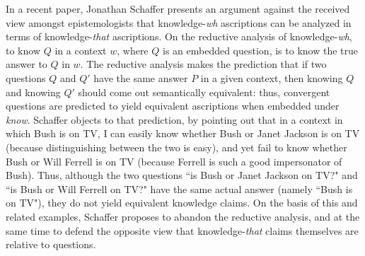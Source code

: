 In a recent paper, Jonathan Schaffer presents an argument against
the received view amongst epistemologists that knowledge-\emph{wh}
ascriptions can be analyzed in terms of knowledge-\emph{that}
ascriptions. On the reductive analysis of knowledge-\emph{wh}, to
know $Q$ in a context $w$, where $Q$ is an embedded question, is
to know the true answer to $Q$ in $w$. The reductive analysis
makes the prediction that if two questions $Q$ and $Q'$ have the
same answer $P$ in a given context, then knowing $Q$ and knowing
$Q'$ should come out semantically equivalent: thus, convergent
questions are predicted to yield equivalent ascriptions when
embedded under \emph{know}. Schaffer objects to that prediction,
by pointing out that in a context in which Bush is on TV, I can
easily know whether Bush or Janet Jackson is on TV (because
distinguishing between the two is easy), and yet fail to know
whether Bush or Will Ferrell is on TV (because Ferrell is such a
good impersonator of Bush). Thus, although the two questions ``is
Bush or Janet Jackson on TV?" and ``is Bush or Will Ferrell on
TV?" have the same actual answer (namely ``Bush is on TV"), they
do not yield equivalent knowledge claims. On the basis of this and
related examples, Schaffer proposes to abandon the reductive
analysis, and at the same time to defend the opposite view that
knowledge-\emph{that} claims themselves are relative to questions.

